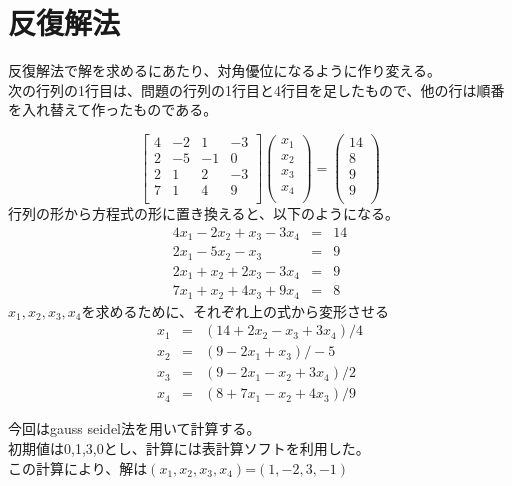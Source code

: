 \documentclass[a4j,twoside,openright,11pt]{jreport}
\begin{document}
\section{反復解法}
反復解法で解を求めるにあたり、対角優位になるように作り変える。\\
次の行列の1行目は、問題の行列の1行目と4行目を足したもので、他の行は順番を入れ替えて作ったものである。

\[
  \left[
    \begin{array}{rrrr}
      4 & -2 & 1 & -3\\
      2 & -5 & -1 & 0\\
      2 & 1 & 2 & -3\\
      7 & 1 & 4 & 9\\
    \end{array}
  \right]
\left(
    \begin{array}{r}
      x_1 \\
      x_2 \\
      x_3 \\
      x_4 \\
    \end{array}
  \right)
  =
\left(
    \begin{array}{r}
      14 \\
      8 \\
      9 \\
      9 \\
    \end{array}
  \right)
\]
行列の形から方程式の形に置き換えると、以下のようになる。
\begin{eqnarray}
4x_1-2x_2+x_3-3x_4&=&14\\
2x_1-5x_2-x_3&=&9\\
2x_1+x_2+2x_3-3x_4&=&9\\
7x_1+x_2+4x_3+9x_4&=&8
\end{eqnarray}
$x_1,x_2,x_3,x_4$を求めるために、それぞれ上の式から変形させる
\begin{eqnarray}
x_1 &=& \left( 14+2x_2-x_3+3x_4 \right) /4  \\
x_2 &=& \left( 9 -2x_1+x_3      \right) /-5 \\ 
x_3 &=& \left( 9 -2x_1-x_2+3x_4 \right) /2  \\ 
x_4 &=& \left( 8 +7x_1-x_2+4x_3 \right) /9
\end{eqnarray}

今回はgauss seidel法を用いて計算する。\\
初期値は0,1,3,0とし、計算には表計算ソフトを利用した。\\
この計算により、解は$\left( x_1,x_2,x_3,x_4 \right)$=$\left(1,-2,3,-1\right)$
\end{document}
